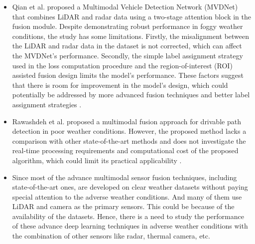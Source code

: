 \documentclass[rnd]{mas_proposal}
\begin{document}
\begin{itemize}
      \item Qian et al. \cite{qian2021robust} proposed a Multimodal Vehicle Detection Network (MVDNet) that combines LiDAR and radar data using a two-stage attention block in the fusion module. Despite demonstrating robust performance in foggy weather conditions, the study has some limitations. Firstly, the misalignment between the LiDAR and radar data in the dataset is not corrected, which can affect the MVDNet's performance. Secondly, the simple label assignment strategy used in the loss computation procedure and the region-of-interest (ROI) assisted fusion design limits the model's performance. These factors suggest that there is room for improvement in the model's design, which could potentially be addressed by more advanced fusion techniques and better label assignment strategies \cite{yang2022ralibev}.
      \item Rawashdeh et al. \cite{rawashdeh2021drivable} proposed a multimodal fusion approach for drivable path detection in poor weather conditions. However, the proposed method lacks a comparison with other state-of-the-art methods and does not investigate the real-time processing requirements and computational cost of the proposed algorithm, which could limit its practical applicability \cite{rawashdeh2021drivable}.

      \item Since most of the advance multimodal sensor fusion techniques, including state-of-the-art ones, are developed on clear weather datasets without paying special attention to the adverse weather conditions. And many of them use LiDAR and camera \cite{feng2020deep} as the primary sensors. This could be because of the availability of the datasets. Hence, there is a need to study the performance of these advance deep learning techniques in adverse weather conditions with the combination of other sensors like radar, thermal camera, etc.
    

\end{itemize}
\end{document}
